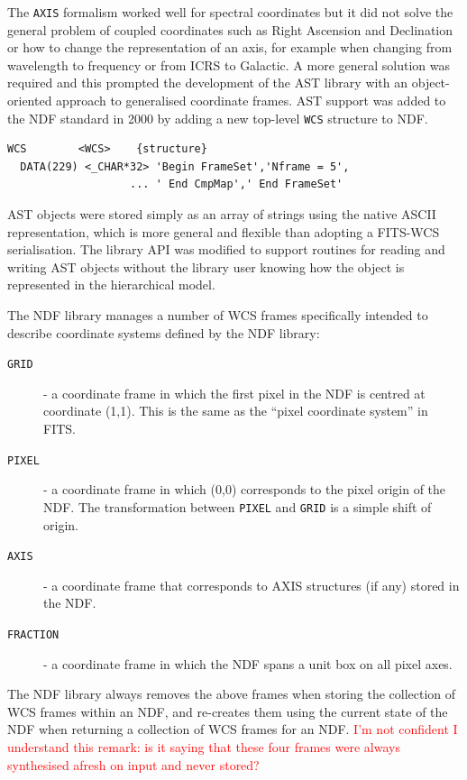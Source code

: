 \documentclass[final,authoryear,5p,times,twocolumn]{elsarticle}
\begin{document}
The \texttt{AXIS} formalism worked well for spectral coordinates but
it did not solve the general problem of coupled coordinates such as
Right Ascension and Declination or how to change the representation of
an axis, for example when changing from wavelength to frequency or from
ICRS to Galactic. A more general solution was required and this
prompted the development of the AST library
\citep{1998ASPC..145...41W} with an object-oriented approach to
generalised coordinate frames. AST support was added to the NDF
standard in 2000 \citep{2001ASPC..238..129B} by adding a new top-level
\texttt{WCS} structure to NDF.

{\small
\begin{verbatim}
WCS        <WCS>    {structure}
  DATA(229) <_CHAR*32> 'Begin FrameSet','Nframe = 5',
                   ... ' End CmpMap',' End FrameSet'
\end{verbatim}
}

AST objects were stored simply as an array of strings using the native
ASCII representation, which is more general and flexible
than adopting a FITS-WCS serialisation. The library API was modified to support routines
for reading and writing AST objects without the library user knowing
how the object is represented in the hierarchical model.

The NDF library manages a number of WCS frames specifically intended to
describe coordinate systems defined by the NDF library:

\begin{description}
\item[\texttt{GRID}] - a coordinate frame in which the first pixel in the NDF is
centred at coordinate (1,1). This is the same as the ``pixel coordinate
system'' in FITS.
\item[\texttt{PIXEL}] - a coordinate frame in which (0,0) corresponds to
the pixel origin of the NDF. The transformation between \texttt{PIXEL}
and \texttt{GRID} is a simple shift of origin.
\item[\texttt{AXIS}] - a coordinate frame that corresponds to AXIS
structures (if any) stored in the NDF.
\item[\texttt{FRACTION}] - a coordinate frame in which the NDF spans a
unit box on all pixel axes.
\end{description}

The NDF library always removes the above frames when storing the
collection of WCS frames
within an NDF, and re-creates them using the current state of the NDF
when returning a collection of WCS frames for an NDF.
\textcolor{red}{I'm not confident I understand this remark: is it saying that
  these four frames were always synthesised afresh on input and never stored?}
\end{document}
